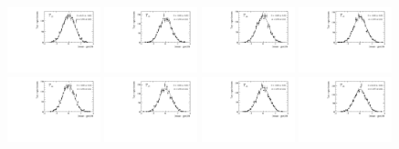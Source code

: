 \begin{figure}
\centering
\includegraphics[width=0.24\textwidth]{figs/kpimm/angular-analysis/toys/pull_m_22.pdf}
\includegraphics[width=0.24\textwidth]{figs/kpimm/angular-analysis/toys/pull_m_23.pdf}
\includegraphics[width=0.24\textwidth]{figs/kpimm/angular-analysis/toys/pull_m_24.pdf}
\includegraphics[width=0.24\textwidth]{figs/kpimm/angular-analysis/toys/pull_m_25.pdf}
\includegraphics[width=0.24\textwidth]{figs/kpimm/angular-analysis/toys/pull_m_26.pdf}
\includegraphics[width=0.24\textwidth]{figs/kpimm/angular-analysis/toys/pull_m_27.pdf}
\includegraphics[width=0.24\textwidth]{figs/kpimm/angular-analysis/toys/pull_m_28.pdf}
\includegraphics[width=0.24\textwidth]{figs/kpimm/angular-analysis/toys/pull_m_29.pdf}

\end{figure}
